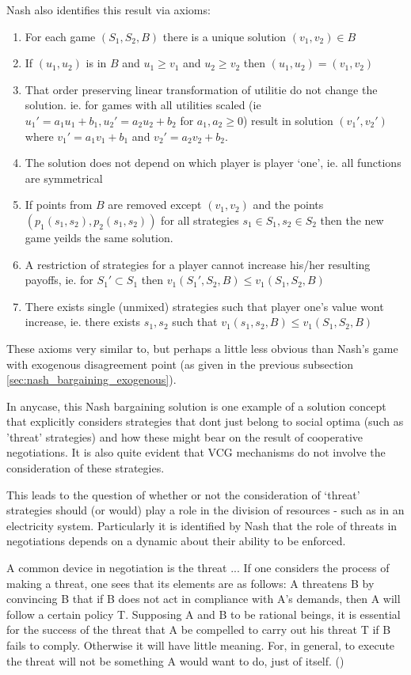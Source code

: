 Nash also identifies this result via axioms:
\begin{enumerate}
\item For each game $(S_1,S_2,B)$ there is a unique solution $(v_1,v_2) \in B$
\item If $(u_1,u_2)$ is in $B$ and $u_1\ge v_1$ and $u_2\ge v_2$ then $(u_1,u_2)=(v_1,v_2)$
\item That order preserving linear transformation of utilitie do not change the solution. ie. for games with all utilities scaled (ie $u_1' = a_1u_1+b_1, u_2' = a_2u_2+b_2$ for $a_1,a_2\ge 0$) result in solution $(v_1',v_2')$ where $v_1'=a_1v_1+b_1$ and $v_2'=a_2v_2+b_2$.
\item The solution does not depend on which player is player `one', ie. all functions are symmetrical
\item If points from $B$ are removed except $(v_1,v_2)$ and the points $(p_1(s_1,s_2), p_2(s_1,s_2))$ for all strategies $s_1\in S_1,s_2\in S_2$ then the new game yeilds the same solution.
\item A restriction of strategies for a player cannot increase his/her resulting payoffs, ie. for $S_1'\subset S_1$ then $v_1(S_1',S_2,B)\le v_1(S_1,S_2,B)$
\item There exists single (unmixed) strategies such that player one's value wont increase, ie. there exists $s_1,s_2$ such that $v_1(s_1,s_2,B)\le v_1(S_1,S_2,B)$
\end{enumerate}

These axioms very similar to, but perhaps a little less obvious than Nash's game with exogenous disagreement point (as given in the previous subsection \ref{sec:nash_bargaining_exogenous}).

In anycase, this Nash bargaining solution is one example of a solution concept that explicitly considers strategies that dont just belong to social optima (such as 'threat' strategies) and how these might bear on the result of cooperative negotiations.
It is also quite evident that VCG mechanisms do not involve the consideration of these strategies.

This leads to the question of whether or not the consideration of `threat' strategies should (or would) play a role in the division of resources - such as in an electricity system.
Particularly it is identified by Nash that the role of threats in negotiations depends on a dynamic about their ability to be enforced.

\begin{displayquote}
A common device in negotiation is the threat ... If one considers the process of making a threat, one sees that its elements are as follows: A threatens B by convincing B that if B does not act in compliance with A's demands, then A will follow a certain policy T. Supposing A and B to be rational beings, it is essential for the success of the threat that A be compelled to carry out his threat T if B fails to comply. Otherwise it will have little meaning. For, in general, to execute the threat will not be something A would want to do, just of itself.
(\cite{nash2})
\end{displayquote}

